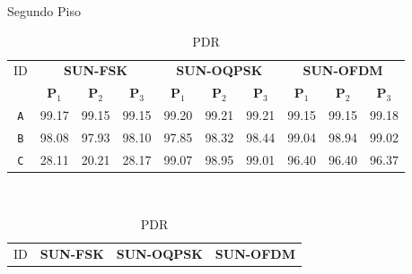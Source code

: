 \begin{table}
      \caption{Segundo Piso}
      \begin{subtable}{\textwidth}
            \begin{center}
                  \begin{tabular}{|c|c|c|c|c|c|c|c|c|c|}
                        \hline
                        ID         & \multicolumn{3}{c|}{\textbf{SUN-FSK}} & \multicolumn{3}{c|}{\textbf{SUN-OQPSK}} & \multicolumn{3}{c|}{\textbf{SUN-OFDM}}                                                                                                       \\ \cline{2-10}
                                   & \textbf{P$_1$}                        & \textbf{P$_2$}                          & \textbf{P$_3$}                         & \textbf{P$_1$} & \textbf{P$_2$} & \textbf{P$_3$} & \textbf{P$_1$} & \textbf{P$_2$} & \textbf{P$_3$} \\ \hline
                        \texttt{A} & 99.17                                 & 99.15                                   & 99.15                                  & 99.20          & 99.21          & 99.21          & 99.15          & 99.15          & 99.18          \\ \hline
                        \texttt{B} & 98.08                                 & 97.93                                   & 98.10                                  & 97.85          & 98.32          & 98.44          & 99.04          & 98.94          & 99.02          \\ \hline
                        \texttt{C} & 28.11                                 & 20.21                                   & 28.17                                  & 99.07          & 98.95          & 99.01          & 96.40          & 96.40          & 96.37          \\ \hline
                  \end{tabular}
                  \caption{PDR}
                  \label{table:pdr2}
            \end{center}
      \end{subtable}%
      \\
      \par\bigskip
      \begin{subtable}{\textwidth}
            \begin{center}
                  \begin{tabular}{|c|c|c|c|c|c|c|c|c|c|}
                        \hline
                        ID         & \multicolumn{3}{c|}{\textbf{SUN-FSK}} & \multicolumn{3}{c|}{\textbf{SUN-OQPSK}} & \multicolumn{3}{c|}{\textbf{SUN-OFDM}}                                                                                                       \\ \cline{2-10}

\end{tabular}
\end{center}
\end{subtable}
\end{table}
